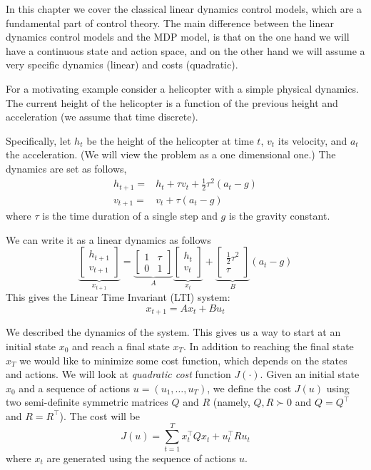 In this chapter we cover the classical linear dynamics control models, which are a fundamental part of control theory. The main difference between the linear dynamics control models and the MDP model, is that on the one hand we will have a continuous state and action space, and on the other hand we will assume a very specific dynamics (linear) and costs (quadratic).

For a motivating example consider a helicopter with a simple
physical dynamics. The current height of the helicopter is a
function of the previous height and acceleration (we assume that time
discrete).

Specifically, let $h_t$ be the height of the helicopter at time $t$,
$v_t$ its velocity, and $a_t$ the acceleration. (We will view the
problem as a one dimensional one.) The dynamics are set as follows,
\begin{align*}
h_{t+1} =& h_t +\tau v_t +\frac{1}{2} \tau^2(a_t-g)\\
v_{t+1} = & v_t +\tau (a_t-g)
\end{align*}
where $\tau$ is the time duration of a single step and $g$ is the gravity constant.

We can write it as a linear dynamics as follows
\[
\underbrace{
\begin{bmatrix}
h_{t+1}\\
v_{t+1}
\end{bmatrix}}_{x_{t+1}}
= \underbrace{
\begin{bmatrix}
1&\tau\\
0&1
\end{bmatrix}
}_A
\underbrace{
\begin{bmatrix}
h_{t}\\
v_{t}
\end{bmatrix}
}_{x_t} +
\underbrace{\begin{bmatrix}
\frac{1}{2}\tau^2\\
\tau
\end{bmatrix}
}_B
(a_t-g)
\]
This gives the Linear Time Invariant (LTI) system:
\[
x_{t+1}=Ax_t+Bu_t
\]

We described the dynamics of the system. This gives us a way to
start at an initial state $x_0$ and reach a final state $x_T$. In
addition to reaching the final state $x_T$ we would like to minimize
some cost function, which depends on the states and actions. We will
look at {\em quadratic cost} function $J(\cdot)$. Given an initial
state $x_0$ and a sequence of actions $u=(u_1, \ldots , u_{T})$, we
define the cost $J(u)$ using two semi-definite symmetric matrices
$Q$ and $R$ (namely,  $Q,R \succ 0$ and $Q=Q^\top$ and $R=R^\top$).
The cost will be
\[
J(u)=\sum_{t=1}^T x_t^\top Q x_t + u_t^\top R u_t
\]
where $x_t$ are generated using the sequence of actions $u$.

